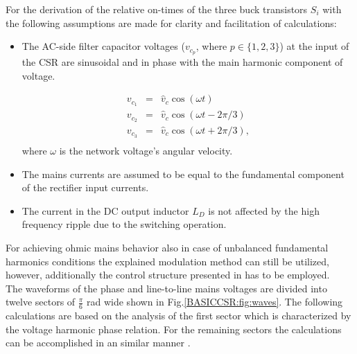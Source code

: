 For the derivation of the relative on-times of the three buck transistors $S_i$ with the following assumptions are made for clarity and facilitation of calculations:
\begin{itemize}
	\item The AC-side filter capacitor voltages ($v_{c_p}$, where $p\in\{1,2,3\}$) at the input of the CSR are sinusoidal and in phase with the main harmonic component of voltage.
	
	\begin{equation}
        \begin{array}{rcl}
            v_{c_1}&=&\widehat{v}_c\cos(\omega t)\\
						v_{c_2}&=&\widehat{v}_c\cos(\omega t-2\pi/3)\\
						v_{c_3}&=&\widehat{v}_c\cos(\omega t+2\pi/3),\\
        \end{array}
        \label{BASICMPC:equ:phasorvect}
    \end{equation}
	where $\omega$ is the network voltage's angular velocity.
	
	\item The mains currents are assumed to be equal to the fundamental component of the rectifier input currents.
	\item The current in the DC output inductor $L_{D}$ is not affected by the high frequency ripple due to the switching operation.
\end{itemize}

 For achieving ohmic mains behavior also in case of unbalanced fundamental harmonics conditions the explained modulation method can still be utilized, however, additionally the control structure presented in \cite{baumann2005novel} has to be employed.\\
The waveforms of the phase and line-to-line mains voltages are divided into twelve sectors of $\frac{\pi}{6}$ rad wide shown in Fig.\ref{BASICCSR:fig:waves}. The following calculations are based on the analysis of the first sector which is characterized by the voltage harmonic phase relation. For the remaining sectors the calculations can be accomplished in an similar manner \cite{nussbaumer2007comprehensive}.

